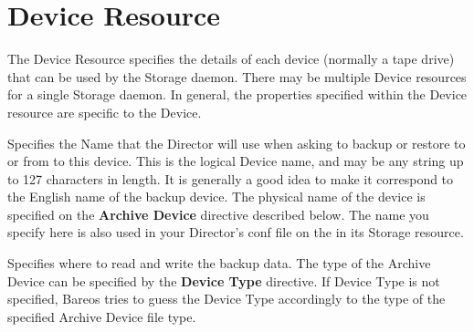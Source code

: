 \section{Device Resource}

The Device Resource specifies the details of each device (normally a tape
drive) that can be used by the Storage daemon.  There may be multiple
Device resources for a single Storage daemon.  In general, the properties
specified within the Device resource are specific to the Device.

\begin{description}

Specifies the Name that the Director will use when asking to backup or
restore to or from to this device. This is the logical  Device name, and may
be any string up to 127 characters in length.  It is generally a good idea to
make it correspond to the English  name of the backup device. The physical
name of the device is  specified on the {\bf Archive Device} directive
described below.  The name you specify here is also used in your Director's
conf  file on the
  in its Storage
resource.

Specifies where to read and write the backup data.
The type of the Archive Device can be specified by the {\bf Device Type} directive.
If Device Type is not specified, Bareos tries to guess the Device Type
accordingly to the type of the specified Archive Device file type.


\end{description}
